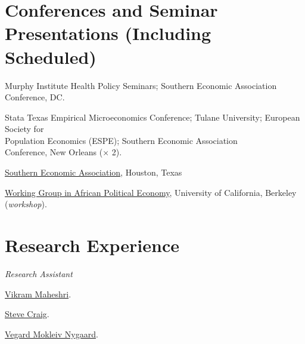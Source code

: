 \documentclass[letterpaper]{article}
\renewenvironment{itemize}{
  \begin{list}{}{
    \setlength{\leftmargin}{1.5em}
  }
}{
  \end{list}
}
\begin{document}
\section*{Conferences and Seminar Presentations (Including Scheduled)}
\vspace{2 mm}
\begin{itemize}
\item {}Murphy Institute Health Policy Seminars; Southern Economic Association \\{\makebox[1.8cm]{\hfill}}Conference, DC.
\item {}Stata Texas Empirical Microeconomics Conference; Tulane University; European Society for \\{\makebox[1.8cm]{\hfill}}Population Economics (ESPE); Southern Economic Association \\{\makebox[1.8cm]{\hfill}}Conference, New Orleans ($\times$ 2).
\item {}\href{https://www.southerneconomic.org/session-details/?conferenceId=7&eventId=3353}%
{Southern Economic Association}, Houston, Texas
\item {}\href{https://cega.berkeley.edu/initiative/working-group-in-african-political-economy/}%
{Working Group in African Political Economy}, University of  California, Berkeley (\textit{workshop}).

\end{itemize}

\vspace{2 mm}

\section*{Research Experience}
\vspace{2 mm}
\textit{Research Assistant}
\begin{itemize}
\item {}\href{https://vmaheshri.github.io/}{Vikram Maheshri}.
\item {}\href{https://www.uh.edu/class/economics/people/current-faculty/steve/}{Steve Craig}.
\item {}\href{https://sites.google.com/site/vegardmokleivnygaard/}{Vegard Mokleiv Nygaard}.


\end{itemize}
\end{document}
